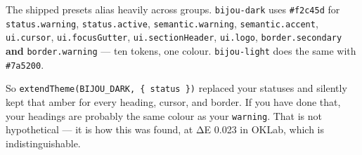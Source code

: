 The shipped presets alias heavily across groups. \texttt{b\allowbreak{}i\allowbreak{}j\allowbreak{}o\allowbreak{}u\allowbreak{}-\allowbreak{}d\allowbreak{}a\allowbreak{}r\allowbreak{}k} uses \texttt{\#\allowbreak{}f\allowbreak{}2\allowbreak{}c\allowbreak{}4\allowbreak{}5\allowbreak{}d} for \texttt{s\allowbreak{}t\allowbreak{}a\allowbreak{}t\allowbreak{}u\allowbreak{}s\allowbreak{}.\allowbreak{}w\allowbreak{}a\allowbreak{}r\allowbreak{}n\allowbreak{}i\allowbreak{}n\allowbreak{}g}, \texttt{s\allowbreak{}t\allowbreak{}a\allowbreak{}t\allowbreak{}u\allowbreak{}s\allowbreak{}.\allowbreak{}a\allowbreak{}c\allowbreak{}t\allowbreak{}i\allowbreak{}v\allowbreak{}e}, \texttt{s\allowbreak{}e\allowbreak{}m\allowbreak{}a\allowbreak{}n\allowbreak{}t\allowbreak{}i\allowbreak{}c\allowbreak{}.\allowbreak{}w\allowbreak{}a\allowbreak{}r\allowbreak{}n\allowbreak{}i\allowbreak{}n\allowbreak{}g}, \texttt{s\allowbreak{}e\allowbreak{}m\allowbreak{}a\allowbreak{}n\allowbreak{}t\allowbreak{}i\allowbreak{}c\allowbreak{}.\allowbreak{}a\allowbreak{}c\allowbreak{}c\allowbreak{}e\allowbreak{}n\allowbreak{}t}, \texttt{u\allowbreak{}i\allowbreak{}.\allowbreak{}c\allowbreak{}u\allowbreak{}r\allowbreak{}s\allowbreak{}o\allowbreak{}r}, \texttt{u\allowbreak{}i\allowbreak{}.\allowbreak{}f\allowbreak{}o\allowbreak{}c\allowbreak{}u\allowbreak{}s\allowbreak{}G\allowbreak{}u\allowbreak{}t\allowbreak{}t\allowbreak{}e\allowbreak{}r}, \texttt{u\allowbreak{}i\allowbreak{}.\allowbreak{}s\allowbreak{}e\allowbreak{}c\allowbreak{}t\allowbreak{}i\allowbreak{}o\allowbreak{}n\allowbreak{}H\allowbreak{}e\allowbreak{}a\allowbreak{}d\allowbreak{}e\allowbreak{}r}, \texttt{u\allowbreak{}i\allowbreak{}.\allowbreak{}l\allowbreak{}o\allowbreak{}g\allowbreak{}o}, \texttt{b\allowbreak{}o\allowbreak{}r\allowbreak{}d\allowbreak{}e\allowbreak{}r\allowbreak{}.\allowbreak{}s\allowbreak{}e\allowbreak{}c\allowbreak{}o\allowbreak{}n\allowbreak{}d\allowbreak{}a\allowbreak{}r\allowbreak{}y} \textbf{and} \texttt{b\allowbreak{}o\allowbreak{}r\allowbreak{}d\allowbreak{}e\allowbreak{}r\allowbreak{}.\allowbreak{}w\allowbreak{}a\allowbreak{}r\allowbreak{}n\allowbreak{}i\allowbreak{}n\allowbreak{}g} --- ten tokens, one colour. \texttt{b\allowbreak{}i\allowbreak{}j\allowbreak{}o\allowbreak{}u\allowbreak{}-\allowbreak{}l\allowbreak{}i\allowbreak{}g\allowbreak{}h\allowbreak{}t} does the same with \texttt{\#\allowbreak{}7\allowbreak{}a\allowbreak{}5\allowbreak{}2\allowbreak{}0\allowbreak{}0}.

So \texttt{e\allowbreak{}x\allowbreak{}t\allowbreak{}e\allowbreak{}n\allowbreak{}d\allowbreak{}T\allowbreak{}h\allowbreak{}e\allowbreak{}m\allowbreak{}e\allowbreak{}(\allowbreak{}B\allowbreak{}I\allowbreak{}J\allowbreak{}O\allowbreak{}U\allowbreak{}\_\allowbreak{}D\allowbreak{}A\allowbreak{}R\allowbreak{}K\allowbreak{},\allowbreak{} \allowbreak{}\{\allowbreak{} \allowbreak{}s\allowbreak{}t\allowbreak{}a\allowbreak{}t\allowbreak{}u\allowbreak{}s\allowbreak{} \allowbreak{}\}\allowbreak{})} replaced your statuses and silently kept that amber for every heading, cursor, and border. If you have done that, your headings are probably the same colour as your \texttt{w\allowbreak{}a\allowbreak{}r\allowbreak{}n\allowbreak{}i\allowbreak{}n\allowbreak{}g}. That is not hypothetical --- it is how this was found, at ΔE 0.023 in OKLab, which is indistinguishable.

